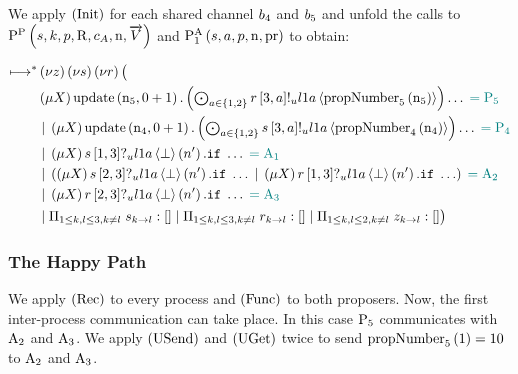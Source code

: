 We apply $\RInit$ for each shared channel $\SharedPoint{4}$ and $\SharedPoint{5}$ and unfold the calls to $\Pp{\ChannelS, \ProcessIndexK, \ProposerRole, \QRoles, \AcceptorCount, \NumberRegister, \VectorV}$ and $\Call{\PaOne}{\ChannelS, \AcceptorRole, \ProposerRole, \NumberRegister, \ProposalRegister}$ to obtain:

\begin{align*}
\mapstostar& \NuChannels\big (\\
&\Mu{\RecursionVariable} \update{\NumberRegister_5}{0 + 1} . \DotForall{\AcceptorRole\in \Curly{1, 2}}{\SendUnreliableP{\ChannelR}{3}{\AcceptorRole}{\LOneA}{\proposalNumber{\NumberRegister_5}{5}}}\ldots \comment{= \Proposer{5}}\\
&\Or \Mu{\RecursionVariable} \update{\NumberRegister_4}{0 + 1} . \DotForall{\AcceptorRole\in \Curly{1, 2}}{\SendUnreliableP{\ChannelS}{3}{\AcceptorRole}{\LOneA}{\proposalNumber{\NumberRegister_4}{4}}}\ldots \comment{= \Proposer{4}}\\
&\Or
    \Mu{\RecursionVariable}
    \ReceiveUnreliableP{\ChannelS}{1}{3}{\LOneA}{\bot}{n'}.
    \mIf \ldots \comment{= \Acceptor{1}}\\
&\Or \Paren{
    \Mu{\RecursionVariable} \ReceiveUnreliableP{\ChannelS}{2}{3}{\LOneA}{\bot}{n'}.\mIf \ldots
    \Or \Mu{\RecursionVariable} \ReceiveUnreliableP{\ChannelR}{1}{3}{\LOneA}{\bot}{n'}.\mIf \ldots
} \comment{= \Acceptor{2}}\\
&\Or \Mu{\RecursionVariable} \ReceiveUnreliableP{\ChannelR}{2}{3}{\LOneA}{\bot}{n'}.\mIf \ldots \comment{= \Acceptor{3}}\\
&\Or \InnerSessionQueues{\ChannelS}
\Or \InnerSessionQueues{\ChannelR}
\Or \OuterSessionQueues
\big )
\end{align*}

\subsubsection{The Happy Path}
We apply $\RRec$ to every process and $\RSideEffect$ to both proposers.
Now, the first inter-process communication can take place.
In this case $\Proposer{5}$ communicates with $\Acceptor{2}$ and $\Acceptor{3}$.
We apply $\RUsend$ and $\RUget$ twice to send $\proposalNumber{1}{5} = 10$ to $\Acceptor{2}$ and $\Acceptor{3}$.

